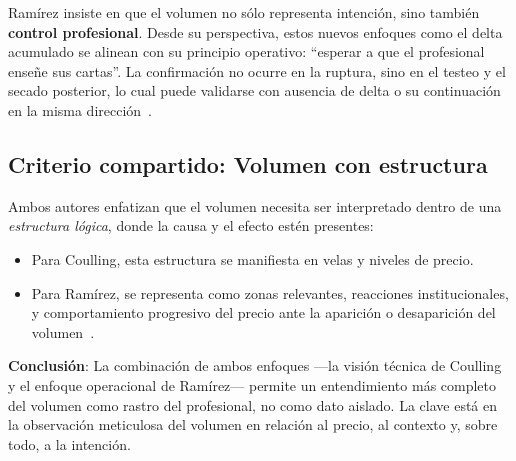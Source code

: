 Ram\'irez insiste en que el volumen no s\'olo representa intenci\'on, sino tambi\'en \textbf{control profesional}. Desde su perspectiva, estos nuevos enfoques como el delta acumulado se alinean con su principio operativo: ``esperar a que el profesional ense\~ne sus cartas''. La confirmaci\'on no ocurre en la ruptura, sino en el testeo y el secado posterior, lo cual puede validarse con ausencia de delta o su continuaci\'on en la misma direcci\'on~\cite{ramirez18}.

\subsection*{Criterio compartido: Volumen con estructura}

Ambos autores enfatizan que el volumen necesita ser interpretado dentro de una \textit{estructura l\'ogica}, donde la causa y el efecto est\'en presentes:

\begin{itemize}
  \item Para Coulling, esta estructura se manifiesta en velas y niveles de precio.
  \item Para Ram\'irez, se representa como zonas relevantes, reacciones institucionales, y comportamiento progresivo del precio ante la aparici\'on o desaparici\'on del volumen~\cite{ramirez18}.
\end{itemize}

\textbf{Conclusi\'on}: La combinaci\'on de ambos enfoques —la visi\'on t\'ecnica de Coulling y el enfoque operacional de Ram\'irez— permite un entendimiento m\'as completo del volumen como rastro del profesional, no como dato aislado. La clave est\'a en la observaci\'on meticulosa del volumen en relaci\'on al precio, al contexto y, sobre todo, a la intenci\'on.
